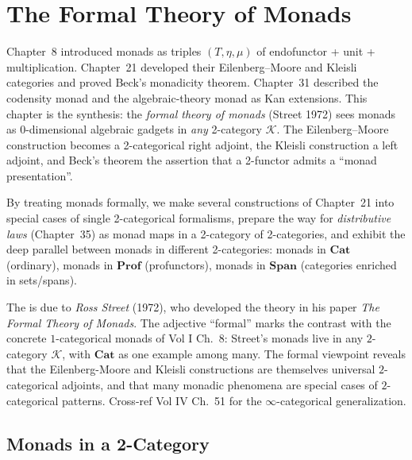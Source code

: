 
\chapter{The Formal Theory of Monads}

\begin{overviewbox}
Chapter~8 introduced monads as triples $(T, \eta, \mu)$ of endofunctor +
unit + multiplication. Chapter~21 developed their Eilenberg--Moore and
Kleisli categories and proved Beck's monadicity theorem. Chapter~31
described the codensity monad and the algebraic-theory monad as Kan
extensions. This chapter is the synthesis: the \emph{formal theory of
monads} (Street 1972) sees monads as 0-dimensional algebraic gadgets in
\emph{any} 2-category $\mathcal{K}$. The Eilenberg--Moore construction
becomes a 2-categorical right adjoint, the Kleisli construction a left
adjoint, and Beck's theorem the assertion that a 2-functor admits a
``monad presentation''.

By treating monads formally, we make several constructions of Chapter~21
into special cases of single 2-categorical formalisms, prepare the way for
\emph{distributive laws} (Chapter~35) as monad maps in a 2-category of
2-categories, and exhibit the deep parallel between monads in different
2-categories: monads in $\mathbf{Cat}$ (ordinary), monads in $\mathbf{Prof}$
(profunctors), monads in $\mathbf{Span}$ (categories enriched in sets/spans).
\end{overviewbox}


\begin{nameorigin}
The  is due to \emph{Ross Street} (1972),
who developed the theory in his paper \emph{The Formal Theory of
Monads}. The adjective ``formal'' marks the contrast with the concrete
$1$-categorical monads of Vol I Ch.~8: Street's monads live in any
$2$-category $\mathcal{K}$, with $\mathbf{Cat}$ as one example among
many. The formal viewpoint reveals that the Eilenberg-Moore and Kleisli
constructions are themselves universal $2$-categorical adjoints, and
that many monadic phenomena are special cases of $2$-categorical
patterns. Cross-ref Vol IV Ch.~51 for the $\infty$-categorical
generalization.
\end{nameorigin}

\section{Monads in a 2-Category}
\label{sec:monads-in-2cat}

